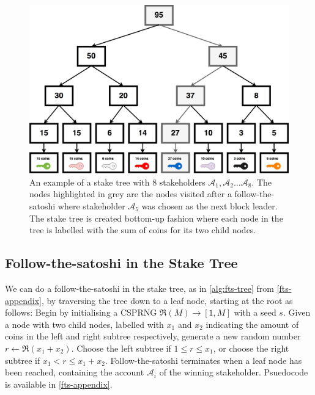 \documentclass{style/kththesis}
\begin{document}
\begin{figure}
    \centering
    \includegraphics[width=\textwidth]{figures/stake-tree}
    \caption{An example of a stake tree with 8 stakeholders $\mathcal{A}_1, \mathcal{A}_2\ldots \mathcal{A}_8$. The nodes highlighted in grey are the nodes visited after a follow-the-satoshi where stakeholder $\mathcal{A}_5$ was chosen as the next block leader. The stake tree is created bottom-up fashion where each node in the tree is labelled with the sum of coins for its two child nodes.}
    \label{fig:stake-tree}
\end{figure}

\subsection{Follow-the-satoshi in the Stake Tree}
\label{fts-tree}
We can do a follow-the-satoshi in the stake tree, as in \cref{alg:fts-tree} from \cref{fts-appendix}, by traversing the tree down to a leaf node, starting at the root as follows: Begin by initialising a CSPRNG $\Re(M) \rightarrow [1, M]$ with a seed $s$. Given a node with two child nodes, labelled with $x_1$ and $x_2$ indicating the amount of coins in the left and right subtree respectively, generate a new random number $r \gets \Re(x_1 + x_2)$. Choose the left subtree if $1 \le r \le x_1$, or choose the right subtree if $x_1 < r \le x_1 + x_2$. Follow-the-satoshi terminates when a leaf node has been reached, containing the account $\mathcal{A}_i$ of the winning stakeholder. Psuedocode is available in \cref{fts-appendix}.
\end{document}
